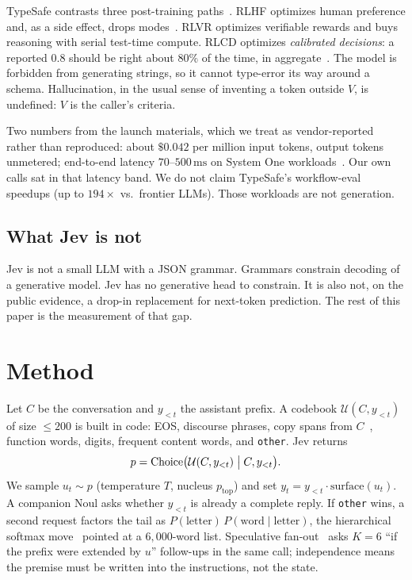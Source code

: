 \documentclass[11pt,twocolumn]{article}
\begin{document}
TypeSafe contrasts three post-training paths~\cite{almeida2026jev}. RLHF optimizes human preference and, as a side effect, drops modes~\cite{ouyang2022}. RLVR optimizes verifiable rewards and buys reasoning with serial test-time compute. RLCD optimizes \emph{calibrated decisions}: a reported $0.8$ should be right about $80\%$ of the time, in aggregate~\cite{guo2017}. The model is forbidden from generating strings, so it cannot type-error its way around a schema. Hallucination, in the usual sense of inventing a token outside $V$, is undefined: $V$ is the caller's criteria.

Two numbers from the launch materials, which we treat as vendor-reported rather than reproduced: about $\$0.042$ per million input tokens, output tokens unmetered; end-to-end latency $70$--$500\,\mathrm{ms}$ on System One workloads~\cite{almeida2026jev}. Our own calls sat in that latency band. We do not claim TypeSafe's workflow-eval speedups (up to $194\times$ vs.\ frontier LLMs). Those workloads are not generation.

\subsection{What Jev is not}

Jev is not a small LLM with a JSON grammar. Grammars constrain decoding of a generative model. Jev has no generative head to constrain. It is also not, on the public evidence, a drop-in replacement for next-token prediction. The rest of this paper is the measurement of that gap.

\section{Method}

Let $C$ be the conversation and $y_{<t}$ the assistant prefix. A codebook $\mathcal{U}(C,y_{<t})$ of size $\le 200$ is built in code: EOS, discourse phrases, copy spans from $C$~\cite{see2017}, function words, digits, frequent content words, and \texttt{other}. Jev returns
\[
p = \mathrm{Choice}\bigl(\mathcal{U}(C,y_{<t}) \bigm| C, y_{<t}\bigr).
\]
We sample $u_t\sim p$ (temperature $T$, nucleus $p_{\mathrm{top}}$) and set $y_t = y_{<t}\cdot \mathrm{surface}(u_t)$. A companion Noul asks whether $y_{<t}$ is already a complete reply. If \texttt{other} wins, a second request factors the tail as $P(\mathrm{letter})\,P(\mathrm{word}\mid\mathrm{letter})$, the hierarchical softmax move~\cite{morin2005} pointed at a $6{,}000$-word list. Speculative fan-out~\cite{leviathan2023} asks $K{=}6$ ``if the prefix were extended by $u$'' follow-ups in the same call; independence means the premise must be written into the instructions, not the state.
\end{document}
